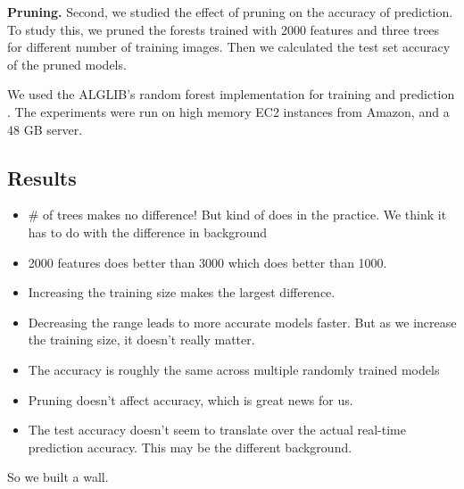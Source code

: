 \textbf{Pruning.} Second, we studied the effect of pruning on the accuracy of prediction. To study this, we pruned the forests trained with 2000 features and three trees for different number of training images. Then we calculated the test set accuracy of the pruned models.


We used the ALGLIB's random forest implementation for training and prediction \cite{alglib}. The experiments were run on high memory EC2 instances from Amazon, and a 48 GB server. 

\subsection{Results}
\begin{itemize}
	\item \# of trees makes no difference! But kind of does in the practice. We think it has to do with the difference in background
	\item 2000 features does better than 3000 which does better than 1000.
	\item Increasing the training size makes the largest difference.
	\item Decreasing the range leads to more accurate models faster. But as we increase the training size, it doesn't really matter.
	\item The accuracy is roughly the same across multiple randomly trained models
	\item Pruning doesn't affect accuracy, which is great news for us.
	\item The test accuracy doesn't seem to translate over the actual real-time prediction accuracy. This may be the different background.
\end{itemize}

So we built a wall.